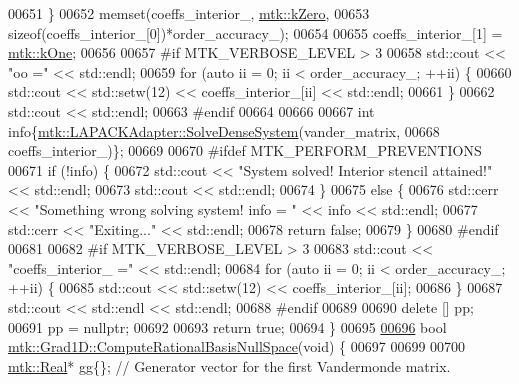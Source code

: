 \begin{DoxyCode}
{{00651   \}
00652   memset(coeffs\_interior\_, \hyperlink{group__c01-roots_ga59a451a5fae30d59649bcda274fea271}{mtk::kZero},
00653 \textcolor{keyword}{sizeof}(coeffs\_interior\_[0])*order\_accuracy\_);
00654 
00655   coeffs\_interior\_[1] = \hyperlink{group__c01-roots_ga26407c24d43b6b95480943340d285c71}{mtk::kOne};
00656 
00657 \textcolor{preprocessor}{  #if MTK\_VERBOSE\_LEVEL > 3}
00658   std::cout << \textcolor{stringliteral}{"oo ="} << std::endl;
00659   \textcolor{keywordflow}{for} (\textcolor{keyword}{auto} ii = 0; ii < order\_accuracy\_; ++ii) \{
00660     std::cout << std::setw(12) << coeffs\_interior\_[ii] << std::endl;
00661   \}
00662   std::cout << std::endl;
00663 \textcolor{preprocessor}{  #endif}
00664 
00666 
00667   \textcolor{keywordtype}{int} info\{\hyperlink{classmtk_1_1LAPACKAdapter_a7428bccf74fd4a4af68fb7233846da22}{mtk::LAPACKAdapter::SolveDenseSystem}(vander\_matrix,
00668                                                 coeffs\_interior\_)\};
00669 
00670 \textcolor{preprocessor}{  #ifdef MTK\_PERFORM\_PREVENTIONS}
00671   \textcolor{keywordflow}{if} (!info) \{
00672     std::cout << \textcolor{stringliteral}{"System solved! Interior stencil attained!"} << std::endl;
00673     std::cout << std::endl;
00674   \}
00675   \textcolor{keywordflow}{else} \{
00676     std::cerr << \textcolor{stringliteral}{"Something wrong solving system! info = "} << info << std::endl;
00677     std::cerr << \textcolor{stringliteral}{"Exiting..."} << std::endl;
00678     \textcolor{keywordflow}{return} \textcolor{keyword}{false};
00679   \}
00680 \textcolor{preprocessor}{  #endif}
00681 
00682 \textcolor{preprocessor}{  #if MTK\_VERBOSE\_LEVEL > 3}
00683   std::cout << \textcolor{stringliteral}{"coeffs\_interior\_ ="} << std::endl;
00684   \textcolor{keywordflow}{for} (\textcolor{keyword}{auto} ii = 0; ii < order\_accuracy\_; ++ii) \{
00685     std::cout << std::setw(12) << coeffs\_interior\_[ii];
00686   \}
00687   std::cout << std::endl << std::endl;
00688 \textcolor{preprocessor}{  #endif}
00689 
00690   \textcolor{keyword}{delete} [] pp;
00691   pp = \textcolor{keyword}{nullptr};
00692 
00693   \textcolor{keywordflow}{return} \textcolor{keyword}{true};
00694 \}
00695 
\hypertarget{mtk__grad__1d_8cc_source_l00696}{}\hyperlink{classmtk_1_1Grad1D_a2d03e6a3961bee558f575ec4099782a9}{00696} \textcolor{keywordtype}{bool} \hyperlink{classmtk_1_1Grad1D_a2d03e6a3961bee558f575ec4099782a9}{mtk::Grad1D::ComputeRationalBasisNullSpace}(\textcolor{keywordtype}{void}) \{
00697 
00699 
00700   \hyperlink{group__c01-roots_gac080bbbf5cbb5502c9f00405f894857d}{mtk::Real}* gg\{\}; \textcolor{comment}{// Generator vector for the first Vandermonde matrix.}
}}
\end{DoxyCode}
